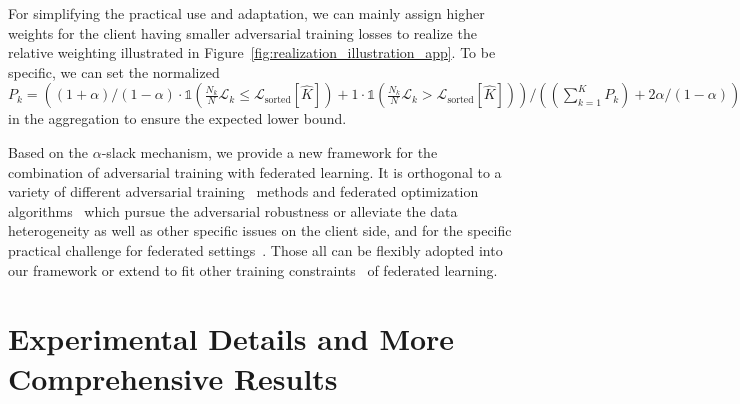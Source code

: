 \documentclass{article} %
\theoremstyle{plain}
\theoremstyle{definition}
\theoremstyle{remark}
\begin{document}
For simplifying the practical use and adaptation, we can mainly assign higher weights for the client having smaller adversarial training losses to realize the relative weighting illustrated in Figure~\ref{fig:realization_illustration_app}. To be specific, we can set the normalized $P_k=((1+\alpha)/(1-\alpha) \cdot \mathds{1}(\frac{N_k}{N}\mathcal{L}_k \leq \mathcal{L}_{\text{sorted}}[\widehat{K}]) + 1 \cdot \mathds{1}(\frac{N_k}{N}\mathcal{L}_k > \mathcal{L}_{\text{sorted}}[\widehat{K}]))/((\sum_{k=1}^K P_k)+2\alpha/(1-\alpha))$ in the aggregation to ensure the expected lower bound.


Based on the $\alpha$-slack mechanism, we provide a new framework for the combination of adversarial training with federated learning. It is orthogonal to a variety of different adversarial training~\citep{Zhang_trades,DeepMind_useto,wang2020once,jiang2020robust,chen2021robust,carmon2019unlabeled,Madry_adversarial_training, chen2020adversarial, ding2020mma, li2021neural,chen2021robust,chen2022sparsity} methods and federated optimization algorithms~\citep{mcmahan2017communication,li2018federated,li2021fedbn,kairouz2019advances} which pursue the adversarial robustness or alleviate the data heterogeneity as well as other specific issues on the client side, and for the specific practical challenge for federated settings~\citep{shah2021adversarial,hong2021federated}. Those all can be flexibly adopted into our framework or extend to fit other training constraints~\citep{kairouz2019advances} of federated learning.


\section{Experimental Details and More Comprehensive Results}
\label{app:exp_details}
\end{document}
